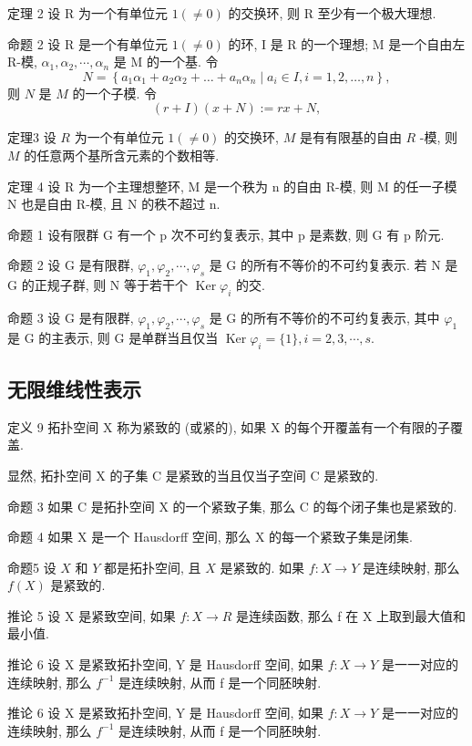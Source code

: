 \documentclass[]{article}
\begin{document}
定理 2 设 R 为一个有单位元 $1(\neq0)$ 的交换环, 则 R 至少有一个极大理想. 

命题 2 设 R 是一个有单位元 $1(\neq0)$ 的环, I 是 R 的一个理想; M 是一个自由左 R-模, $\alpha_{1}, \alpha_{2}, \cdots, \alpha_{n}$ 是 M 的一个基. 令 $$
N = \left\{a _ {1} \alpha_ {1} + a _ {2} \alpha_ {2} + \dots + a _ {n} \alpha_ {n} \mid a _ {i} \in I, i = 1, 2, \dots , n \right\}, 
$$则 $N$ 是 $M$ 的一个子模. 令 $$
(r + I) (x + N) := r x + N, 
$$

定理3 设 $R$ 为一个有单位元 $1(\neq 0)$ 的交换环, $M$ 是有有限基的自由 $R$ -模, 则 $M$ 的任意两个基所含元素的个数相等. 

定理 4 设 R 为一个主理想整环, M 是一个秩为 n 的自由 R-模, 则 M 的任一子模 N 也是自由 R-模, 且 N 的秩不超过 n. 

命题 1 设有限群 G 有一个 p 次不可约复表示, 其中 p 是素数, 则 G 有 p 阶元. 

命题 2 设 G 是有限群, $\varphi_{1}, \varphi_{2}, \cdots, \varphi_{s}$ 是 G 的所有不等价的不可约复表示. 若 N 是 G 的正规子群, 则 N 等于若干个 $\operatorname{Ker}\varphi_{i}$ 的交. 

命题 3 设 G 是有限群, $\varphi_{1}, \varphi_{2}, \cdots, \varphi_{s}$ 是 G 的所有不等价的不可约复表示, 其中 $\varphi_{1}$ 是 G 的主表示, 则 G 是单群当且仅当 $\operatorname{Ker} \varphi_{i} = \{1\}, i = 2, 3, \cdots, s.$ 

\subsection{无限维线性表示}

定义 9 拓扑空间 X 称为紧致的 (或紧的), 如果 X 的每个开覆盖有一个有限的子覆盖. 

显然, 拓扑空间 X 的子集 C 是紧致的当且仅当子空间 C 是紧致的. 

命题 3 如果 C 是拓扑空间 X 的一个紧致子集, 那么 C 的每个闭子集也是紧致的. 

命题 4 如果 X 是一个 Hausdorff 空间, 那么 X 的每一个紧致子集是闭集. 

命题5 设 $X$ 和 $Y$ 都是拓扑空间, 且 $X$ 是紧致的. 如果 $f: X \to Y$ 是连续映射, 那么 $f(X)$ 是紧致的. 

推论 5 设 X 是紧致空间, 如果 $f: X \to R$ 是连续函数, 那么 f 在 X 上取到最大值和最小值. 

推论 6 设 X 是紧致拓扑空间, Y 是 Hausdorff 空间, 如果 $f: X \rightarrow Y$ 是一一对应的连续映射, 那么 $f^{-1}$ 是连续映射, 从而 f 是一个同胚映射. 

推论 6 设 X 是紧致拓扑空间, Y 是 Hausdorff 空间, 如果 $f: X \rightarrow Y$ 是一一对应的连续映射, 那么 $f^{-1}$ 是连续映射, 从而 f 是一个同胚映射. 
\end{document}
